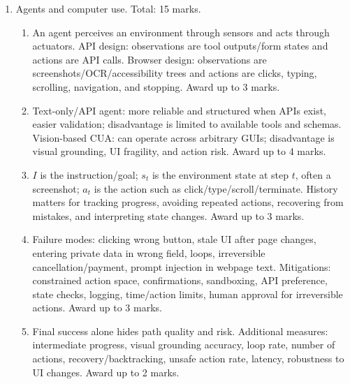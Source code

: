 \documentclass[11pt,a4paper]{article}
\begin{document}
\begin{enumerate}[leftmargin=*]
\item Agents and computer use. Total: 15 marks.
\begin{enumerate}
\item An agent perceives an environment through sensors and acts through actuators. API design: observations are tool outputs/form states and actions are API calls. Browser design: observations are screenshots/OCR/accessibility trees and actions are clicks, typing, scrolling, navigation, and stopping. Award up to 3 marks.
\item Text-only/API agent: more reliable and structured when APIs exist, easier validation; disadvantage is limited to available tools and schemas. Vision-based CUA: can operate across arbitrary GUIs; disadvantage is visual grounding, UI fragility, and action risk. Award up to 4 marks.
\item \(I\) is the instruction/goal; \(s_t\) is the environment state at step \(t\), often a screenshot; \(a_t\) is the action such as click/type/scroll/terminate. History matters for tracking progress, avoiding repeated actions, recovering from mistakes, and interpreting state changes. Award up to 3 marks.
\item Failure modes: clicking wrong button, stale UI after page changes, entering private data in wrong field, loops, irreversible cancellation/payment, prompt injection in webpage text. Mitigations: constrained action space, confirmations, sandboxing, API preference, state checks, logging, time/action limits, human approval for irreversible actions. Award up to 3 marks.
\item Final success alone hides path quality and risk. Additional measures: intermediate progress, visual grounding accuracy, loop rate, number of actions, recovery/backtracking, unsafe action rate, latency, robustness to UI changes. Award up to 2 marks.
\end{enumerate}


\end{enumerate}
\end{document}
